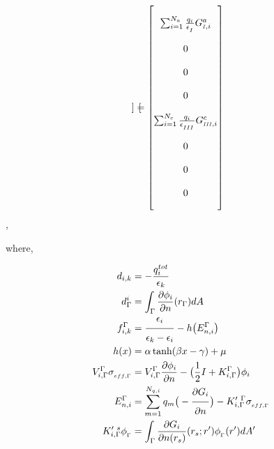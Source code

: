 \documentclass{article}
\newcommand{\RomCap}[1]
    {\MakeUppercase{\scaleto{\romannumeral #1}{3.5pt}}}
\newcommand{\myfrac}[3][0pt]{\genfrac{}{}{}{}{\raisebox{#1}{$#2$}}{\raisebox{-#1}{$#3$}}}
\begin{document}
\begin{equation}
\begin{bmatrix}
	    \end{bmatrix} = \begin{bmatrix}
	    \\
	    \sum_{i=1}^{N_a}\frac{q_i}{\epsilon_{_\RomCap{1}}}G_{\RomCap{1},i}^{a} \\ \\
	    0 \\ \\
	    0 \\ \\
	    0 \\ \\
	    \sum_{i=1}^{N_c}\frac{q_i}{\epsilon_{_\RomCap{3}}}G_{\RomCap{3},i}^{c} \\ \\
	    0 \\ \\
	    0 \\ \\
	    0 \\ \\

	    \end{bmatrix}
	\end{equation},

	where, 


\begin{align*} 
d_{i,k} &=  -\frac{q^{tot}_i}{\epsilon_k} \\ 
d_{\Gamma}^{i} &= \int_{\Gamma}\frac{\partial{\phi_i}}{\partial{n}}(r_{\Gamma}) dA \\
f_{i,k}^\Gamma &= \myfrac[3pt]{\epsilon_i}{\epsilon_k-\epsilon_i} - h\big(E_{n,i}^{\Gamma}\big)\\
h(x) &= \alpha \tanh(\beta x - \gamma) + \mu \\
V^{\Gamma}_{i,\Gamma} \sigma_{_{eff,\Gamma}} &= V^{\Gamma}_{i,\Gamma} \frac{\partial{\phi_i}}{\partial{n}} - \big( \frac{1}{2}I+K^{\Gamma}_{i,\Gamma} \big)\phi_i \\
E_{n,i}^\Gamma &= \sum_{m=1}^{N_{q,i}}q_m\big(-\myfrac[3pt]{\partial{G_i}}{\partial{n}}\big) - K'^{\ \Gamma}_{i,\Gamma}\sigma_{_{eff,\Gamma}}\\
K'^{\ s}_{i,\Gamma} \phi_{_\Gamma} &= \int_\Gamma\frac{\partial G_i}{\partial{n(r_s)}}(r_s;r')\phi_{_\Gamma}(r')dA' \\
\end{align*}
\end{document}
